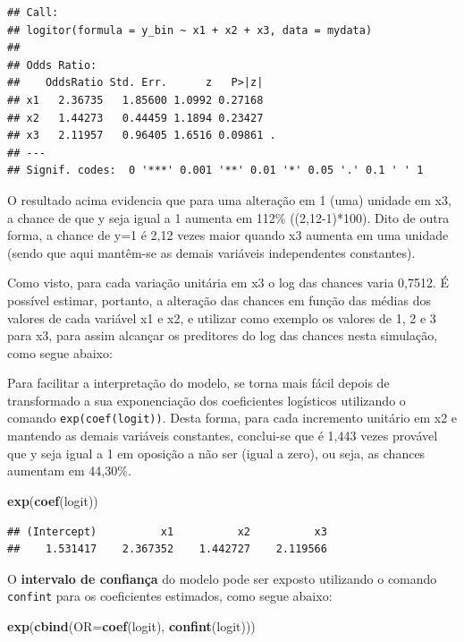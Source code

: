 \documentclass[12pt,brazil,]{book}
\newenvironment{Shaded}{\begin{snugshade}}{\end{snugshade}}
\newcommand{\DataTypeTok}[1]{\textcolor[rgb]{0.13,0.29,0.53}{#1}}
\newcommand{\KeywordTok}[1]{\textcolor[rgb]{0.13,0.29,0.53}{\textbf{#1}}}
\newcommand{\NormalTok}[1]{#1}
\begin{document}
\begin{verbatim}
## Call:
## logitor(formula = y_bin ~ x1 + x2 + x3, data = mydata)
## 
## Odds Ratio:
##    OddsRatio Std. Err.      z   P>|z|  
## x1   2.36735   1.85600 1.0992 0.27168  
## x2   1.44273   0.44459 1.1894 0.23427  
## x3   2.11957   0.96405 1.6516 0.09861 .
## ---
## Signif. codes:  0 '***' 0.001 '**' 0.01 '*' 0.05 '.' 0.1 ' ' 1
\end{verbatim}

O resultado acima evidencia que para uma alteração em 1 (uma) unidade em
x3, a chance de que y seja igual a 1 aumenta em 112\% ((2,12-1)*100).
Dito de outra forma, a chance de y=1 é 2,12 vezes maior quando x3
aumenta em uma unidade (sendo que aqui mantêm-se as demais variáveis
independentes constantes).

Como visto, para cada variação unitária em x3 o log das chances varia
0,7512. É possível estimar, portanto, a alteração das chances em função
das médias dos valores de cada variável x1 e x2, e utilizar como exemplo
os valores de 1, 2 e 3 para x3, para assim alcançar os preditores do log
das chances nesta simulação, como segue abaixo:

Para facilitar a interpretação do modelo, se torna mais fácil depois de
transformado a sua exponenciação dos coeficientes logísticos utilizando
o comando \texttt{exp(coef(logit))}. Desta forma, para cada incremento
unitário em x2 e mantendo as demais variáveis constantes, conclui-se que
é 1,443 vezes provável que y seja igual a 1 em oposição a não ser (igual
a zero), ou seja, as chances aumentam em 44,30\%.

\begin{Shaded}
\begin{Highlighting}[]
\KeywordTok{exp}\NormalTok{(}\KeywordTok{coef}\NormalTok{(logit))}
\end{Highlighting}
\end{Shaded}

\begin{verbatim}
## (Intercept)          x1          x2          x3 
##    1.531417    2.367352    1.442727    2.119566
\end{verbatim}

O \textbf{intervalo de confiança} do modelo pode ser exposto utilizando
o comando \texttt{confint} para os coeficientes estimados, como segue
abaixo:

\begin{Shaded}
\begin{Highlighting}[]
\KeywordTok{exp}\NormalTok{(}\KeywordTok{cbind}\NormalTok{(}\DataTypeTok{OR=}\KeywordTok{coef}\NormalTok{(logit), }\KeywordTok{confint}\NormalTok{(logit)))}
\end{Highlighting}
\end{Shaded}
\end{document}
